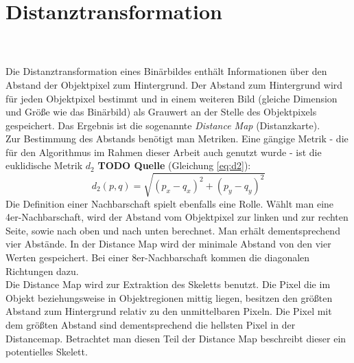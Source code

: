 \section{Distanztransformation}
\\\\
Die Distanztransformation eines Binärbildes enthält Informationen über den Abstand der Objektpixel zum Hintergrund. Der Abstand zum Hintergrund wird für jeden Objektpixel bestimmt und in einem
weiteren Bild (gleiche Dimension und Größe wie das Binärbild) als Grauwert an der Stelle des Objektpixels gespeichert. Das Ergebnis ist die sogenannte \emph{Distance Map} (Distanzkarte). \\
Zur Bestimmung des Abstands benötigt man Metriken. Eine gängige Metrik - die für den Algorithmus im Rahmen dieser Arbeit auch genutzt wurde - ist die euklidische Metrik $d_2$ \textbf{TODO Quelle} (Gleichung \ref{eq:d2}):
\begin{equation}
\label{eq:d2}
d_2(p,q) = \sqrt{(p_x - q_x)^2 + (p_y - q_y)^2}  
\end{equation}
Die Definition einer Nachbarschaft spielt
ebenfalls eine Rolle. Wählt man eine
4er-Nachbarschaft, wird der Abstand vom Objektpixel zur linken und zur rechten Seite, sowie nach oben und nach unten berechnet. Man erhält dementsprechend
vier Abstände. In der Distance Map wird der minimale Abstand von den vier Werten
gespeichert. Bei einer 8er-Nachbarschaft
kommen die diagonalen Richtungen dazu.\\
Die Distance Map wird zur Extraktion des Skeletts benutzt. Die
Pixel die im Objekt beziehungsweise in Objektregionen mittig liegen, besitzen den größten Abstand zum Hintergrund relativ zu den unmittelbaren Pixeln. Die Pixel mit dem größten Abstand sind dementsprechend die hellsten Pixel in der Distancemap. Betrachtet man diesen Teil der Distance Map beschreibt dieser ein potentielles Skelett.
\label{sec:distanztransformation}
